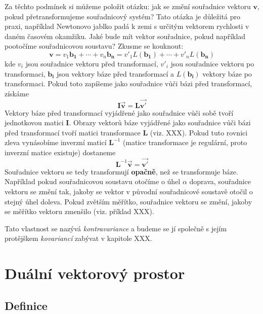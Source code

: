 \documentclass[a5paper,12pt]{amsbook}
\theoremstyle{definition}
\newcommand{\myscalar}[1]{#1}
\newcommand{\myvec}[1]{\bm{#1}}
\newcommand{\mycoord}[1]{\overrightarrow{\mathbf{#1}}}
\newcommand{\mymatrix}[1]{\mathbf{#1}}
\newcommand{\mymap}[1]{#1}
\begin{document}
Za těchto podmínek si můžeme položit otázku: jak se změní souřadnice vektoru $\myvec{v}$,
pokud přetransformujeme souřadnicový systém? Tato otázka je důležitá pro praxi, například
Newtonovo jablko padá k zemi s určitým vektorem rychlosti v daném časovém okamžiku. Jaké
bude mít vektor souřadnice, pokud například pootočíme souřadnicovou soustavu? Zkusme se
kouknout:
\begin{equation*}
\myvec{v} = \myscalar{v_1}\myvec{b_1} + \cdots + \myscalar{v_n}\myvec{b_n}
          = \myscalar{v'_1}\mymap{L}(\myvec{b_1}) + \cdots + \myscalar{v'_n}\mymap{L}(\myvec{b_n})
\end{equation*}
kde $\myscalar{v_i}$ jsou souřadnice vektoru před transformací, $\myscalar{v'_i}$ jsou souřadnice
vektoru po transformaci, $\myvec{b_i}$ jsou vektory báze před transformací a $\mymap{L}(\myvec{b_i})$
vektory báze po transformaci. Pokud toto zapíšeme jako souřadnice vůči bázi před transformací, získáme
\begin{equation*}
\mymatrix{I}\mycoord{v} = \mymatrix{L}\mycoord{v'}
\end{equation*}
Vektory báze před transformací vyjádřené jako souřadnice vůči sobě tvoří jednotkovou matici
$\mymatrix{I}$. Obrazy vektorů báze vyjádřené jako souřadnice vůči bázi před transformací
tvoří matici transformace $\mymatrix{L}$ (viz. XXX). Pokud tuto rovnici zleva vynásobíme
inverzní maticí $\mymatrix{L}^{-1}$ (matice transformace je regulární, proto inverzní
matice existuje) dostaneme
\begin{equation*}
\mymatrix{L}^{-1}\mycoord{v} = \mycoord{v'}
\end{equation*}
Souřadnice vektoru se tedy transformují \textbf{opačně}, než se transformuje báze.
Například pokud souřadnicovou soustavu otočíme o úhel $\alpha$ doprava, souřadnice vektoru
se změní tak, jakoby se vektor v původní souřadnicové soustavě otočil o stejný úhel doleva.
Pokud zvětším měřítko, souřadnice vektoru se změní, jakoby se měřítko vektoru zmenšilo (viz.
příklad XXX).

Tato vlastnost se nazývá \textit{kontravariance} a budeme se jí společně s jejím protějškem
\textit{kovariancí} zabývat v kapitole XXX.

\chapter{Duální vektorový prostor}

\section{Definice}
\end{document}
